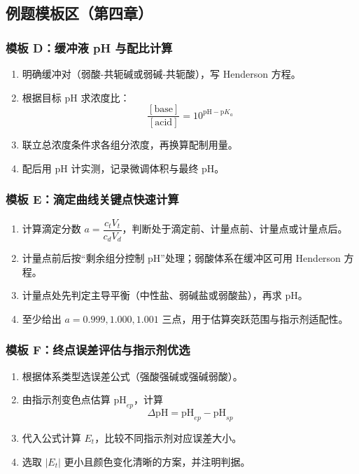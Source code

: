 \documentclass[12pt,a4paper]{article}
\numberwithin{equation}{section}
\newenvironment{exampletemplate}[1]{
\subsubsection*{#1}
\begin{enumerate}
}{
\end{enumerate}
}
\begin{document}
\subsection{例题模板区（第四章）}

\begin{exampletemplate}{模板 D：缓冲液 pH 与配比计算}
    \item 明确缓冲对（弱酸-共轭碱或弱碱-共轭酸），写 Henderson 方程。
    \item 根据目标 pH 求浓度比：
\begin{equation}
    \frac{[\text{base}]}{[\text{acid}]}=10^{\mathrm{pH}-\mathrm{p}K_a}
\end{equation}
    \item 联立总浓度条件求各组分浓度，再换算配制用量。
    \item 配后用 pH 计实测，记录微调体积与最终 pH。
\end{exampletemplate}

\begin{exampletemplate}{模板 E：滴定曲线关键点快速计算}
    \item 计算滴定分数 $a=\dfrac{c_tV_t}{c_dV_d}$，判断处于滴定前、计量点前、计量点或计量点后。
    \item 计量点前后按“剩余组分控制 pH”处理；弱酸体系在缓冲区可用 Henderson 方程。
    \item 计量点处先判定主导平衡（中性盐、弱碱盐或弱酸盐），再求 pH。
    \item 至少给出 $a=0.999,1.000,1.001$ 三点，用于估算突跃范围与指示剂适配性。
\end{exampletemplate}

\begin{exampletemplate}{模板 F：终点误差评估与指示剂优选}
    \item 根据体系类型选误差公式（强酸强碱或强碱弱酸）。
    \item 由指示剂变色点估算 $\mathrm{pH}_{ep}$，计算
\begin{equation}
    \Delta\mathrm{pH}=\mathrm{pH}_{ep}-\mathrm{pH}_{sp}
\end{equation}
    \item 代入公式计算 $E_t$，比较不同指示剂对应误差大小。
    \item 选取 $|E_t|$ 更小且颜色变化清晰的方案，并注明判据。
\end{exampletemplate}
\end{document}
